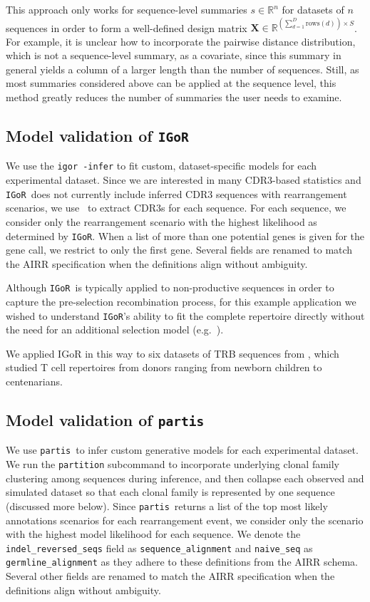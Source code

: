 \documentclass{article}
\newcommand{\partis}{\texttt{partis}}
\newcommand{\igor}{\texttt{IGoR}}
\newcommand{\igblast}{\text{IgBlast}}
\begin{document}
This approach only works for sequence-level summaries $s \in \mathbb{R}^n$ for datasets of $n$ sequences in order to form a well-defined design matrix $\mathbf X \in \mathbb{R}^{\left(\sum_{d=1}^D \text{rows}(d) \right) \times S}$.
For example, it is unclear how to incorporate the pairwise distance distribution, which is not a sequence-level summary, as a covariate, since this summary in general yields a column of a larger length than the number of sequences.
Still, as most summaries considered above can be applied at the sequence level, this method greatly reduces the number of summaries the user needs to examine.

\subsection*{Model validation of \igor}
We use the \texttt{igor -infer} to fit custom, dataset-specific models for each experimental dataset.
Since we are interested in many CDR3-based statistics and \igor\ does not currently include inferred CDR3 sequences with rearrangement scenarios, we use \igblast\ to extract CDR3s for each sequence.
For each sequence, we consider only the rearrangement scenario with the highest likelihood as determined by \igor.
When a list of more than one potential genes is given for the gene call, we restrict to only the first gene.
Several fields are renamed to match the AIRR specification when the definitions align without ambiguity.

Although \igor\ is typically applied to non-productive sequences in order to capture the pre-selection recombination process, for this example application we wished to understand \igor's ability to fit the complete repertoire directly without the need for an additional selection model (e.g.\ \cite{Elhanati2014-mf}).

We applied IGoR in this way to six datasets of TRB sequences from \cite{Britanova2016-iw}, which studied T cell repertoires from donors ranging from newborn children to centenarians.

\subsection*{Model validation of \partis}

We use \partis\ to infer custom generative models for each experimental dataset.
We run the \texttt{partition} subcommand to incorporate underlying clonal family clustering among sequences during inference, and then collapse each observed and simulated dataset so that each clonal family is represented by one sequence (discussed more below).
Since \partis\ returns a list of the top most likely annotations scenarios for each rearrangement event, we consider only the scenario with the highest model likelihood for each sequence.
We denote the \texttt{indel\_reversed\_seqs} field as \texttt{sequence\_alignment} and \texttt{naive\_seq} as \texttt{germline\_alignment} as they adhere to these definitions from the AIRR schema.
Several other fields are renamed to match the AIRR specification when the definitions align without ambiguity.
\end{document}

